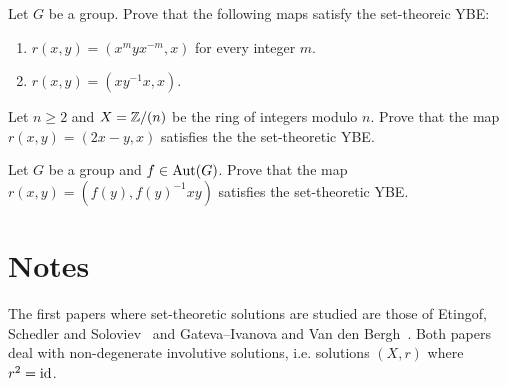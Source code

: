 \begin{prob}
\label{prob:Wada_racks}
	Let $G$ be a group. Prove that the following maps satisfy the set-theoreic YBE:
	\begin{enumerate}[label=\alph*)]
	\item $r(x,y)=(x^myx^{-m},x)$ for every integer $m$.
	\item $r(x,y)=(xy^{-1}x,x)$.
\end{enumerate}	
\end{prob}

\begin{prob}
\label{prob:D_n}
Let $n\geq2$ and $X=\mathbb{Z}/(n)$ be the ring of integers modulo $n$. Prove that
the map $r(x,y)=(2x-y,x)$ satisfies the the set-theoretic YBE.  	
\end{prob}


\begin{prob}
Let $G$ be a group and $f\in\operatorname{Aut}(G)$. Prove that 
the map $r(x,y)=(f(y),f(y)^{-1}xy)$ satisfies the set-theoretic YBE.	
\end{prob}



%
%
%


\section*{Notes}

The first papers where set-theoretic solutions are studied are those of Etingof, Schedler and Soloviev~\cite{MR1722951} 
and Gateva--Ivanova and Van den Bergh~\cite{MR1637256}. 
Both papers deal with non-degenerate involutive solutions, i.e. solutions
$(X,r)$ where $r^2=\operatorname{id}$.  


